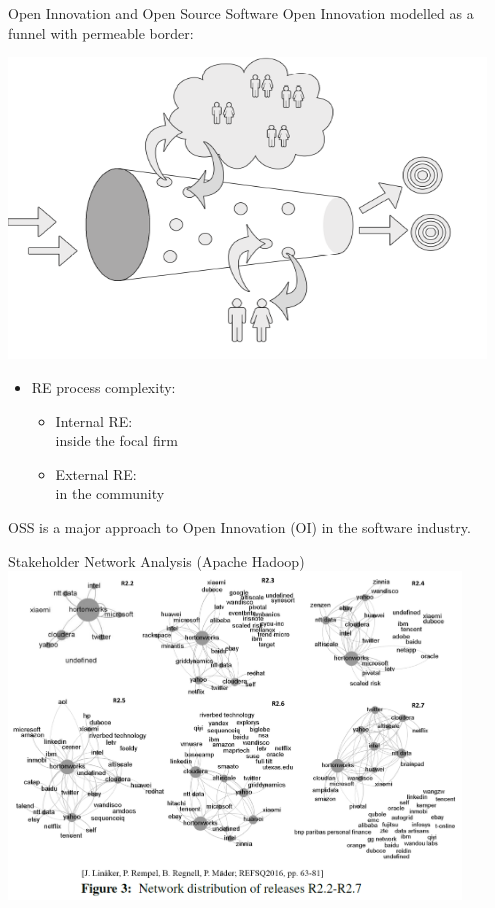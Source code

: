 \documentclass{slideclass}
\begin{document}
\begin{Slide}{Open Innovation and Open Source Software}
Open Innovation modelled as a funnel with permeable border:
{}

\vspace{1em}
\begin{minipage}{0.59\textwidth}
\includegraphics[width=0.95\textwidth]{img/oi}
\end{minipage}
\begin{minipage}{0.4\textwidth}
\SlideFontSmall\pause
\begin{itemize}
\item RE process complexity:
\begin{itemize}\SlideFontSmall
\item Internal RE:\\inside the focal firm
\item External RE:\\in the community
\end{itemize}
\end{itemize}
\end{minipage}

{\SlideFontSmall\pause\vspace{2em}OSS is a major approach to Open Innovation (OI) in the software industry.\vspace{1em}}
\end{Slide}


\begin{Slide}{Stakeholder Network Analysis (Apache Hadoop)}
\includegraphics[width=0.90\textwidth]{img/sna}
\end{Slide}
\end{document}

